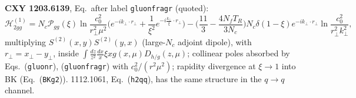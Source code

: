 \noindent\textbf{CXY 1203.6139}, Eq.~after label \texttt{gluonfragr} (quoted):
\begin{equation*}
\mathcal{H}_{2gg}^{(1)}=N_{c}\mathcal{P}_{gg}(\xi)\ln\frac{c_{0}^{2}}{r_{\perp}^{2}\mu^{2}}\Big(e^{-ik_{\perp}\cdot r_{\perp}}+\frac{1}{\xi^{2}}e^{-i\frac{k_{\perp}}{\xi}\cdot r_{\perp}}\Big)-\Big(\frac{11}{3}-\frac{4N_{f}T_{R}}{3N_{c}}\Big)N_{c}\delta(1-\xi)e^{-ik_{\perp}\cdot r_{\perp}}\ln\frac{c_{0}^{2}}{r_{\perp}^{2}k_{\perp}^{2}},
\end{equation*}
multiplying $S^{(2)}(x,y)S^{(2)}(y,x)$ (large-$N_{c}$ adjoint dipole), with $r_{\perp}=x_{\perp}-y_{\perp}$, inside $\int\frac{dz}{z^{2}}\frac{dx}{x}\xi xg(x,\mu)D_{h/g}(z,\mu)$; collinear poles absorbed by Eqs.~(\texttt{gluonr}), (\texttt{gluonfragr}) with $c_{0}^{2}/(r^{2}\mu^{2})$; rapidity divergence at $\xi\to1$ into BK (Eq.~(\texttt{BKg2})). 1112.1061, Eq.~(\texttt{h2qq}), has the same structure in the $q\to q$ channel.
